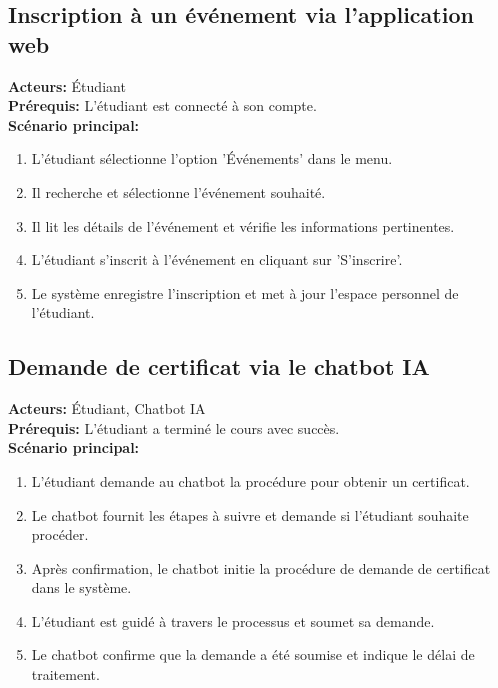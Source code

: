 \documentclass[a4paper, 11pt, openany]{report}
\begin{document}
\subsection{Inscription à un événement via l'application web}
\textbf{Acteurs:} Étudiant \\
\textbf{Prérequis:} L'étudiant est connecté à son compte. \\
\textbf{Scénario principal:}
\begin{enumerate}
    \item L'étudiant sélectionne l'option 'Événements' dans le menu.
    \item Il recherche et sélectionne l'événement souhaité.
    \item Il lit les détails de l'événement et vérifie les informations pertinentes.
    \item L'étudiant s'inscrit à l'événement en cliquant sur 'S'inscrire'.
    \item Le système enregistre l'inscription et met à jour l'espace personnel de l'étudiant.
\end{enumerate}

\subsection{Demande de certificat via le chatbot IA}
\textbf{Acteurs:} Étudiant, Chatbot IA \\
\textbf{Prérequis:} L'étudiant a terminé le cours avec succès. \\
\textbf{Scénario principal:}
\begin{enumerate}
    \item L'étudiant demande au chatbot la procédure pour obtenir un certificat.
    \item Le chatbot fournit les étapes à suivre et demande si l'étudiant souhaite procéder.
    \item Après confirmation, le chatbot initie la procédure de demande de certificat dans le système.
    \item L'étudiant est guidé à travers le processus et soumet sa demande.
    \item Le chatbot confirme que la demande a été soumise et indique le délai de traitement.
\end{enumerate}
\end{document}
